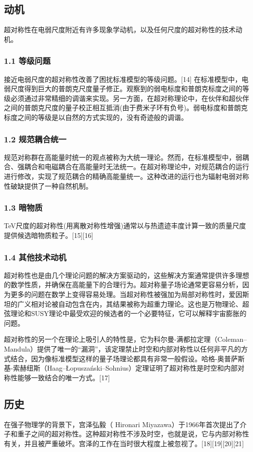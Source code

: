 \subsection{动机}
超对称性在电弱尺度附近有许多现象学动机，以及任何尺度的超对称性的技术动机。
\subsubsection{1.1 等级问题}
接近电弱尺度的超对称性改善了困扰标准模型的等级问题。[14] 在标准模型中，电弱尺度得到巨大的普朗克尺度量子修正。观察到的弱电标度和普朗克标度之间的等级必须通过非常精细的调谐来实现。另一方面，在超对称理论中，在伙伴和超伙伴之间的普朗克尺度的量子校正相互抵消(由于费米子环有负号)。弱电标度和普朗克标度之间的等级是以自然的方式实现的，没有奇迹般的调谐。
\subsubsection{1.2 规范耦合统一}
规范对称群在高能量时统一的观点被称为大统一理论。然而，在标准模型中，弱耦合、强耦合和电磁耦合在高能量时无法统一。在超对称理论中，对规范耦合的运行进行修改，实现了规范耦合的精确高能量统一。这种改进的运行也为辐射电弱对称性破缺提供了一种自然机制。
\subsubsection{1.3 暗物质}
TeV尺度的超对称性(用离散对称性增强)通常以与热遗迹丰度计算一致的质量尺度提供候选暗物质粒子。[15][16]
\subsubsection{1.4 其他技术动机}
超对称性也是由几个理论问题的解决方案驱动的，这些解决方案通常提供许多理想的数学性质，并确保在高能量下的合理行为。超对称量子场论通常更容易分析，因为更多的问题在数学上变得容易处理。当超对称性被强加为局部对称性时，爱因斯坦的广义相对论被自动包含在内，其结果被称为超重力理论。这也是万物理论、超弦理论和SUSY理论中最受欢迎的候选者的一个必要特征，它可以解释宇宙膨胀的问题。

超对称性的另一个在理论上吸引人的特性是，它为科尔曼-满都拉定理（Coleman–Mandula）提供了唯一的“漏洞”，该定理禁止时空和内部对称性以任何非平凡的方式结合，因为像标准模型这样的量子场理论都具有非常一般假设。哈格-奥普萨斯基-索赫纽斯（Haag–Łopuszański–Sohnius）定理证明了超对称性是时空和内部对称性能够一致结合的唯一方式。[17]

\subsection{历史}
在强子物理学的背景下，宫泽弘毅（ Hironari Miyazawa）于1966年首次提出了介子和重子之间的超对称性。这种超对称性不涉及时空，也就是说，它与内部对称性有关，并且被严重破坏。宫泽的工作在当时很大程度上被忽视了。[18][19][20][21]


